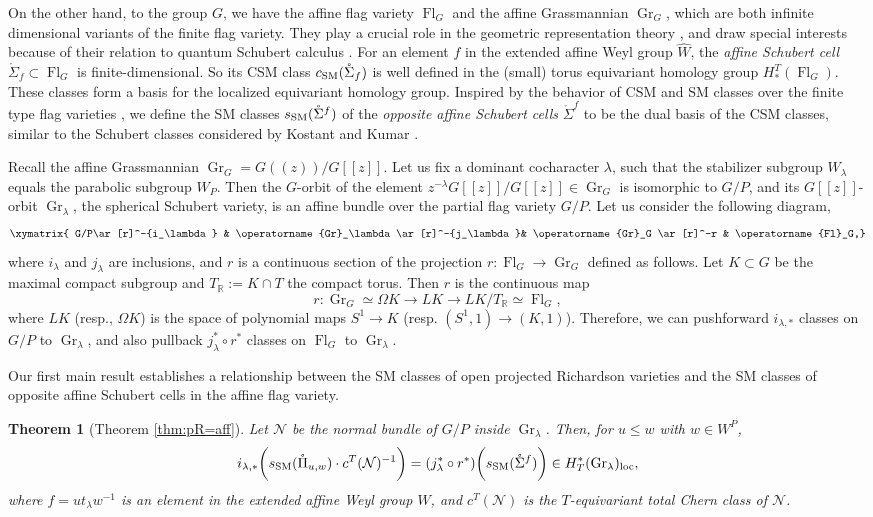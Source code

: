 \documentclass[12pt]{amsart}
\newtheorem{Thm}{Theorem}[section]
\def\CSM{c_{\rm SM}}
\def\SSM{s_{\rm SM}}
\def\Gr{\operatorname{Gr}}
\def\Gr{\operatorname{Gr}}
\def\Fl{\operatorname{Fl}}
\def\loc{\operatorname{loc}}
\begin{document}
On the other hand, to the group $G$, we have the affine flag variety $\Fl_G$ and the affine Grassmannian $\Gr_G$, which are both infinite dimensional variants of the finite flag variety. They play a crucial  role in the geometric representation theory \cite{Zhu}, and draw special interests because of  their relation to quantum Schubert calculus \cite{P97,LS10,Kato}. 
For an element $f$ in the  extended affine Weyl group $\widehat{W}$, the {\it affine Schubert cell} $\mathring{\Sigma}_f\subset \Fl_G$ is finite-dimensional. 
So its CSM class $\CSM(\mathring{\Sigma}_f)$ is well defined in the (small) torus equivariant homology group $H^T_*(\Fl_G)$. 
These classes form a basis for the localized equivariant homology group. Inspired by the behavior of CSM and SM classes over the finite type flag varieties \cite{AMSS23}, we define the SM classes $\SSM(\mathring{\Sigma}^f)$ of the {\it opposite affine Schubert cells} $\mathring{\Sigma}^f$ to be the dual basis of the CSM classes, similar to the Schubert classes considered  by Kostant and Kumar \cite{KK86}. 


Recall the affine Grassmannian $\Gr_G=G(\!(z)\!)/G[[z]]$. 
Let us fix a dominant cocharacter $\lambda$, such that the stabilizer subgroup $W_\lambda$ equals the parabolic subgroup  $W_P$. 
Then the $G$-orbit of the element $z^{-\lambda}G[[z]]/G[[z]]\in \Gr_G$ is isomorphic to $G/P$, and its $G[[z]]$-orbit $\Gr_\lambda$, the spherical Schubert variety, is an affine bundle over the partial flag variety $G/P$. 
Let us consider the following diagram,
$$\xymatrix{
G/P\ar[r]^-{i_\lambda} & \Gr_\lambda\ar[r]^-{j_\lambda}& \Gr_G \ar[r]^-r &  \Fl_G,}$$
where $i_\lambda$ and $j_\lambda$ are  inclusions, and $r$ is a continuous section of the projection $r: \Fl_G\to \Gr_G$ defined as follows. 
Let $K\subset G$ be the maximal compact subgroup and $T_\mathbb{R}:=K\cap T$  the compact torus. Then $r$ is the continuous map 
\[r\colon \Gr_G\simeq \Omega K\rightarrow LK\rightarrow LK/T_\mathbb{R}\simeq \Fl_G,\] 
where $LK$ (resp., $\Omega K$) is the space of polynomial maps $S^1\to K$ (resp. $(S^1,1)\to (K,1)$). Therefore, we can pushforward $i_{\lambda,*}$ classes on $G/P$ to $\Gr_\lambda$, and also pullback $j_\lambda^*\circ r^*$ classes on $\Fl_G$ to $\Gr_\lambda$.

Our first main result establishes a relationship between the SM classes of open projected Richardson varieties and the SM classes of opposite affine Schubert cells in the affine flag variety. 

\begin{Thm}[Theorem \ref{thm:pR=aff}]\label{thm-B}
Let $\mathcal{N}$ be the normal bundle of $G/P$ inside $\Gr_\lambda$. Then, for  $u\leq w$ with $w\in W^P$,
$$i_{\lambda,*}\bigg(\SSM(\mathring{\Pi}_{u,w})\cdot c^T(\mathcal{N})^{-1}\bigg)
= (j_\lambda^*\circ r^*)\bigg(\SSM(\mathring{\Sigma}^{f})\bigg)
\in H_T^*(\Gr_\lambda)_{\loc},
$$
where $f=ut_{\lambda}w^{-1}$ is an element in the extended affine Weyl group $\widehat{W}$, 
and $c^T(\mathcal{N})$ is the $T$-equivariant total Chern class of $\mathcal{N}$.
\end{Thm}
\end{document}
